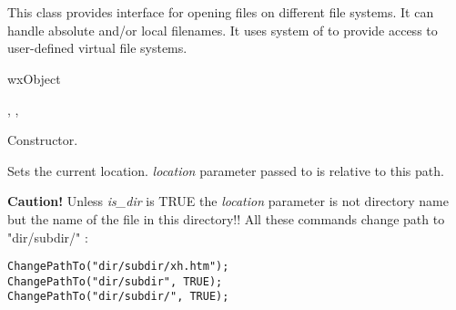 %
%

\section{}\label{wxfilesystem}

This class provides interface for opening files on different
file systems. It can handle absolute and/or local filenames.
It uses system of  to
provide access to user-defined virtual file systems.


wxObject


,
,


\label{wxfilesystemwxfilesystem}


Constructor. 

\label{wxfilesystemchangepathto}


Sets the current location. {\it location} parameter passed to 
 is relative to this path.

{\bf Caution! } Unless {\it is\_dir} is TRUE the {\it location} parameter
is not directory name but the name of the file in this directory!! All these
commands change path to "dir/subdir/" :

\begin{verbatim}
ChangePathTo("dir/subdir/xh.htm");
ChangePathTo("dir/subdir", TRUE);
ChangePathTo("dir/subdir/", TRUE);
\end{verbatim}





